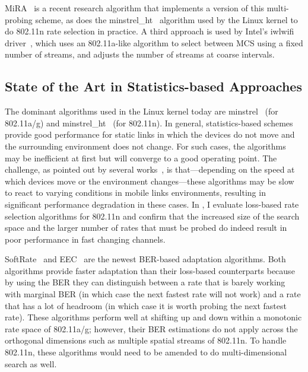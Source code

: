 MiRA~\cite{Pefkianakis_MiRA} is a recent research algorithm that implements a version of this multi-probing scheme, as does the minstrel\_ht~\cite{minstrel_ht} algorithm used by the Linux kernel to do 802.11n rate selection in practice. A third approach is used by Intel's iwlwifi driver~\cite{iwlwifi}, which uses an 802.11a-like algorithm to select between MCS using a fixed number of streams, and adjusts the number of streams at coarse intervals.

\subsection{State of the Art in Statistics-based Approaches}
The dominant algorithms used in the Linux kernel today are minstrel~\cite{minstrel} (for 802.11a/g) and minstrel\_ht~\cite{minstrel_ht} (for 802.11n).  In general, statistics-based schemes provide good performance for static links in which the devices do not move and the surrounding environment does not change. For such cases, the algorithms may be inefficient at first but will converge to a good operating point. The challenge, as pointed out by several works~\cite{Holland_RBAR,Judd_CHARM,Vutukuru_SoftRate}, is that---depending on the speed at which devices move or the environment changes---these algorithms may be slow to react to varying conditions in mobile links environments, resulting in significant performance degradation in these cases. In , I evaluate loss-based rate selection algorithms for 802.11n and confirm that the increased size of the search space and the larger number of rates that must be probed do indeed result in poor performance in fast changing channels.

SoftRate~\cite{Vutukuru_SoftRate} and EEC~\cite{Chen_EEC} are the newest BER-based adaptation algorithms. Both algorithms provide faster adaptation than their loss-based counterparts because by using the BER they can distinguish between a rate that is barely working with marginal BER (in which case the next fastest rate will not work) and a rate that has a lot of headroom (in which case it is worth probing the next fastest rate). These algorithms perform well at shifting up and down within a monotonic rate space of 802.11a/g; however, their BER estimations do not apply across the orthogonal dimensions such as multiple spatial streams of 802.11n. To handle 802.11n, these algorithms would need to be amended to do multi-dimensional search as well.


